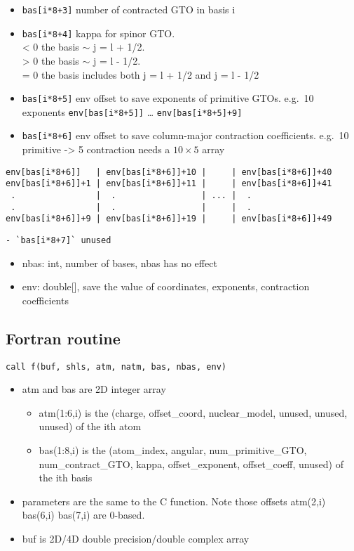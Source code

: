 \documentclass{article}
\begin{document}
\begin{itemize}
\begin{itemize}
  \item
    \verb!bas[i*8+3]! number of contracted GTO in basis i
  \item
    \verb!bas[i*8+4]! kappa for spinor GTO.\\ \textless{} 0 the basis
    \ensuremath{\sim} j = l + 1/2.\\ \textgreater{} 0 the basis
    \ensuremath{\sim} j = l - 1/2.\\ = 0 the basis includes both j = l
    + 1/2 and j = l - 1/2
  \item
    \verb!bas[i*8+5]! env offset to save exponents of primitive GTOs.
    e.g.~10 exponents \verb!env[bas[i*8+5]]! \ldots{}
    \verb!env[bas[i*8+5]+9]!
  \item
    \verb!bas[i*8+6]! env offset to save column-major contraction
    coefficients. e.g.~10 primitive -\textgreater{} 5 contraction needs
    a $10\times 5$ array
  \end{itemize}
\end{itemize}
\begin{verbatim}
env[bas[i*8+6]]   | env[bas[i*8+6]]+10 |     | env[bas[i*8+6]]+40
env[bas[i*8+6]]+1 | env[bas[i*8+6]]+11 |     | env[bas[i*8+6]]+41
 .                |  .                 | ... |  .                
 .                |  .                 |     |  .                
env[bas[i*8+6]]+9 | env[bas[i*8+6]]+19 |     | env[bas[i*8+6]]+49
\end{verbatim}
\begin{verbatim}
- `bas[i*8+7]` unused
\end{verbatim}
\begin{itemize}
\item
  nbas: int, number of bases, nbas has no effect
\item
  env: double[], save the value of coordinates, exponents,
  contraction coefficients
\end{itemize}
\subsection{Fortran routine}

\begin{verbatim}
call f(buf, shls, atm, natm, bas, nbas, env)
\end{verbatim}
\begin{itemize}
\item
  atm and bas are 2D integer array
  \begin{itemize}
  \item
    atm(1:6,i) is the (charge, offset\_coord, nuclear\_model, unused,
    unused, unused) of the ith atom
  \item
    bas(1:8,i) is the (atom\_index, angular, num\_primitive\_GTO,
    num\_contract\_GTO, kappa, offset\_exponent, offset\_coeff, unused)
    of the ith basis
  \end{itemize}
\item
  parameters are the same to the C function. Note those offsets
  atm(2,i) bas(6,i) bas(7,i) are 0-based.
\item
  buf is 2D/4D double precision/double complex array
\end{itemize}
\end{document}
